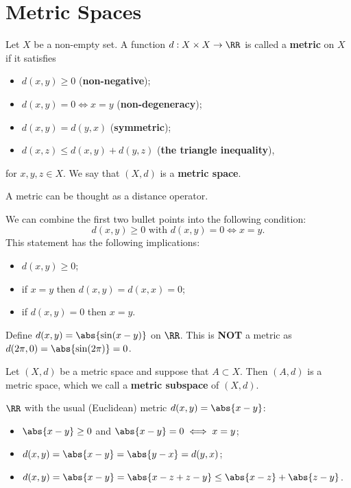 \documentclass[12pt, a4paper]{article}
\begin{document}
\section{Metric Spaces}

\begin{definition}
    Let \(X\) be a non-empty set. A function \(d : X \times X \to \RR\) is called a \textbf{metric} on \(X\) if it satisfies 
    \begin{itemize}
        \item \(d(x,y) \geq 0\) (\textbf{non-negative});
        \item \(d(x,y) = 0 \iff x = y\) (\textbf{non-degeneracy});
        \item \(d(x,y)=d(y,x)\) (\textbf{symmetric});
        \item \(d(x,z) \leq d(x,y)+d(y,z)\) (\textbf{the triangle inequality}),
    \end{itemize}
    for \(x,y,z \in X\).
    We say that \((X,d)\) is a \textbf{metric space}.
\end{definition}

\begin{mdnote}
    A metric can be thought as a distance operator.
\end{mdnote}

\begin{mdremark}
    We can combine the first two bullet points into the following condition:
    \[d(x,y) \geq 0 \text{ with } d(x,y)=0 \iff x=y.\]
    This statement has the following implications:
    \begin{itemize}
        \item \(d(x,y) \geq 0\);
        \item if \(x=y\) then \(d(x,y)=d(x,x)=0\);
        \item if \(d(x,y)=0\) then \(x=y\).
    \end{itemize}
    \begin{example}
        Define \(d(x,y)=\abs{\sin(x-y)}\) on \(\RR\). This is \textbf{NOT} a metric as \(d(2\pi,0)=\abs{\sin(2\pi)}=0\).
    \end{example}
\end{mdremark}

\begin{definition}
    Let \((X,d)\) be a metric space and suppose that \(A \subset X\). Then \((A,d)\) is a metric space, which we call a \textbf{metric subspace} of \((X,d)\).
\end{definition}

\begin{example}
    \(\RR\) with the usual (Euclidean) metric \(d(x,y)=\abs{x-y}\):
    \begin{itemize}
        \item \(\abs{x-y} \geq 0\) and \(\abs{x-y} = 0 \iff x=y\);
        \item \(d(x,y) = \abs{x-y}=\abs{y-x} = d(y,x)\);
        \item \(d(x,y) = \abs{x-y} = \abs{x-z+z-y} \leq \abs{x-z}+\abs{z-y}\).
    \end{itemize}
\end{example}
\end{document}

